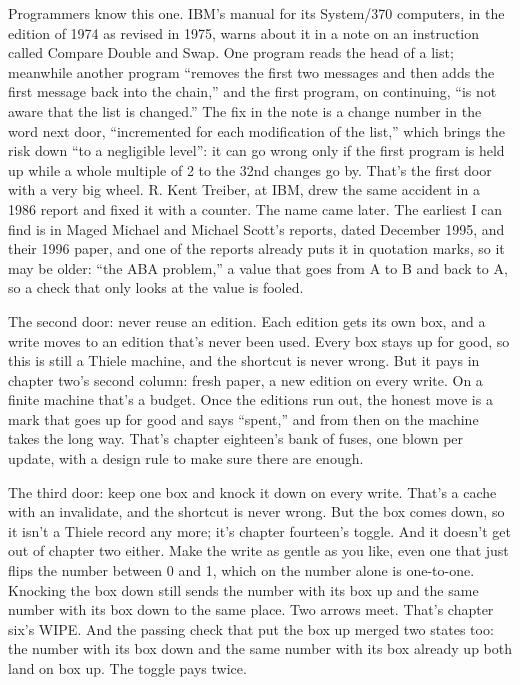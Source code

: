 \documentclass[11pt,twoside]{article}
\theoremstyle{thielethm}
\theoremstyle{thieledef}
\theoremstyle{thieledef}
\theoremstyle{thieledef}
\theoremstyle{thielethm}
\theoremstyle{thieleobs}
\theoremstyle{thielethm}
\begin{document}
Programmers know this one. IBM's manual for its System/370 computers, in the edition of 1974 as revised in 1975, warns about it in a note on an instruction called Compare Double and Swap. One program reads the head of a list; meanwhile another program ``removes the first two messages and then adds the first message back into the chain,'' and the first program, on continuing, ``is not aware that the list is changed.'' The fix in the note is a change number in the word next door, ``incremented for each modification of the list,'' which brings the risk down ``to a negligible level'': it can go wrong only if the first program is held up while a whole multiple of 2 to the 32nd changes go by. That's the first door with a very big wheel. R. Kent Treiber, at IBM, drew the same accident in a 1986 report and fixed it with a counter. The name came later. The earliest I can find is in Maged Michael and Michael Scott's reports, dated December 1995, and their 1996 paper, and one of the reports already puts it in quotation marks, so it may be older: ``the ABA problem,'' a value that goes from A to B and back to A, so a check that only looks at the value is fooled.

The second door: never reuse an edition. Each edition gets its own box, and a write moves to an edition that's never been used. Every box stays up for good, so this is still a Thiele machine, and the shortcut is never wrong. But it pays in chapter two's second column: fresh paper, a new edition on every write. On a finite machine that's a budget. Once the editions run out, the honest move is a mark that goes up for good and says ``spent,'' and from then on the machine takes the long way. That's chapter eighteen's bank of fuses, one blown per update, with a design rule to make sure there are enough.

The third door: keep one box and knock it down on every write. That's a cache with an invalidate, and the shortcut is never wrong. But the box comes down, so it isn't a Thiele record any more; it's chapter fourteen's toggle. And it doesn't get out of chapter two either. Make the write as gentle as you like, even one that just flips the number between 0 and 1, which on the number alone is one-to-one. Knocking the box down still sends the number with its box up and the same number with its box down to the same place. Two arrows meet. That's chapter six's WIPE. And the passing check that put the box up merged two states too: the number with its box down and the same number with its box already up both land on box up. The toggle pays twice.
\end{document}
